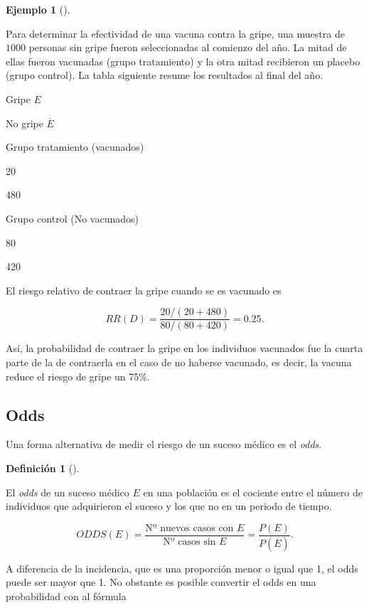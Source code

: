 \documentclass[
  a4paper,
]{scrreport}
\theoremstyle{plain}
\theoremstyle{definition}
\newtheorem{example}{Ejemplo}[chapter]
\theoremstyle{definition}
\newtheorem{definition}{Definición}[chapter]
\theoremstyle{remark}
\begin{document}
\begin{example}[]\protect\hypertarget{exm-riesgo-relativo}{}\label{exm-riesgo-relativo}

Para determinar la efectividad de una vacuna contra la gripe, una
muestra de \(1000\) personas sin gripe fueron seleccionadas al comienzo
del año. La mitad de ellas fueron vacunadas (grupo tratamiento) y la
otra mitad recibieron un placebo (grupo control). La tabla siguiente
resume los resultados al final del año.

Gripe \(E\)

No gripe \(\overline E\)

Grupo tratamiento (vacunados)

20

480

Grupo control (No vacunados)

80

420

El riesgo relativo de contraer la gripe cuando se es vacunado es

\[RR(D) = \frac{20/(20+480)}{80/(80+420)} = 0.25.\]

Así, la probabilidad de contraer la gripe en los individuos vacunados
fue la cuarta parte de la de contraerla en el caso de no haberse
vacunado, es decir, la vacuna reduce el riesgo de gripe un 75\%.

\end{example}

\subsection{Odds}\label{odds}

Una forma alternativa de medir el riesgo de un suceso médico es el
\emph{odds}.

\begin{definition}[]\protect\hypertarget{def-odds}{}\label{def-odds}

El \emph{odds} de un suceso médico \(E\) en una población es el cociente
entre el número de individuos que adquirieron el suceso y los que no en
un periodo de tiempo.

\[ODDS(E)=\frac{\mbox{Nº nuevos casos con $E$}}{\mbox{Nº casos sin $E$}}=\frac{P(E)}{P(\overline E)}.\]

\end{definition}

A diferencia de la incidencia, que es una proporción menor o igual que
1, el odds puede ser mayor que 1. No obstante es posible convertir el
odds en una probabilidad con al fórmula
\end{document}

